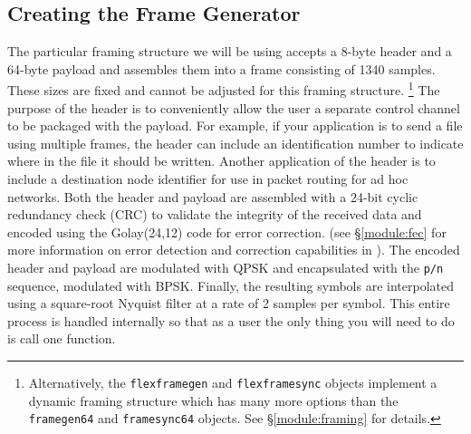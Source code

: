 \subsection{Creating the Frame Generator}
\label{tutorial:framing:framegen}
The particular framing structure we will be using accepts a 8-byte
header and a 64-byte payload and assembles them into a frame
consisting of 1340 samples.
These sizes are fixed and cannot be adjusted for this framing
structure.%
\footnote{
    Alternatively, the {\tt flexframegen} and {\tt flexframesync}
    objects implement a dynamic framing structure which has many more
    options than the {\tt framegen64} and {\tt framesync64} objects.
    See \S\ref{module:framing} for details.}
The purpose of the header is to conveniently allow the user a separate
control channel to be packaged with the payload.
For example, if your application is to send a file using multiple
frames, the header can include an identification number to indicate
where in the file it should be written.
Another application of the header is to include a destination node
identifier for use in packet routing for ad hoc networks.
Both the header and payload are assembled with a 24-bit cyclic
redundancy check (CRC) to validate the integrity of the received data
and encoded using the Golay(24,12) code for error correction.
(see \S\ref{module:fec} for more information on error detection
and correction capabilities in \liquid).
The encoded header and payload are modulated with QPSK and encapsulated
with the {\tt p/n} sequence, modulated with BPSK.
Finally, the resulting symbols are interpolated using a square-root
Nyquist filter at a rate of 2 samples per symbol.
This entire process is handled internally so that as a user the only
thing you will need to do is call one function.

